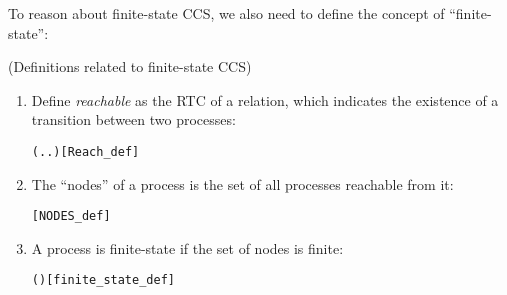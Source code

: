 
To reason about finite-state CCS, we also need to define the concept
of ``finite-state'':
\begin{definition}{(Definitions related to finite-state CCS)}
\begin{enumerate}
\item Define \emph{reachable} as the RTC of a relation, which
  indicates the existence of a transition between two processes:
\begin{alltt}
 \HOLSymConst{=} (\HOLTokenLambda{} . \HOLSymConst{\HOLTokenExists{}}.  \HOLTokenTransBegin{}\HOLTokenTransEnd {})\HOLSymConst{\HOLTokenSupStar{}}\hfill[Reach_def]
\end{alltt}
\item The ``nodes'' of a process is the set of all processes reachable
  from it:
\begin{alltt}
  \HOLSymConst{=} \HOLTokenLeftbrace{} \HOLTokenBar{}   \HOLTokenRightbrace{}\hfill[NODES_def]
\end{alltt}
\item A process is finite-state if the set of nodes is finite:
\begin{alltt}
  \HOLSymConst{\HOLTokenEquiv{}}  ( )\hfill[finite_state_def]
\end{alltt}
\end{enumerate}
\end{definition}

